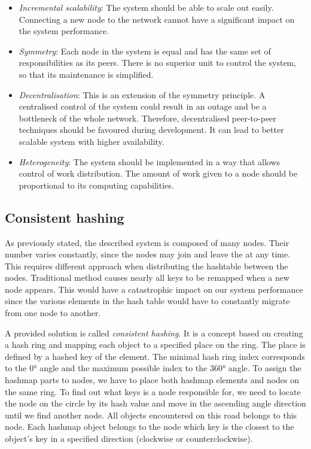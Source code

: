         \begin{itemize}
            \item \textit{Incremental scalability}:
                The system should be able to scale out easily.
                Connecting a new node to the network cannot have a significant impact on the system performance.
            \item \textit{Symmetry}:
                Each node in the system is equal and has the same set of responsibilities as its peers. 
                There is no superior unit to control the system, so that its maintenance is simplified.
            \item \textit{Decentralisation}:
                This is an extension of the symmetry principle.
                A centralised control of the system could result in an outage and be a bottleneck of the whole network.
                Therefore, decentralised peer-to-peer techniques should be favoured during development.
                It can lead to better scalable system with higher availability.
            \item \textit{Heterogeneity}:
                The system should be implemented in a way that allows control of work distribution. 
                The amount of work given to a node should be proportional to its computing capabilities.
        \end{itemize}

    \subsection{Consistent hashing}
        As previously stated, the described system is composed of many nodes. 
        Their number varies constantly, since the nodes may join and leave the at any time.
        This requires different approach when distributing the hashtable between the nodes.
        Traditional method causes nearly all keys to be remapped when a new node appears.
        This would have a catastrophic impact on our system performance since the various elements in the hash table would have to constantly migrate from one node to another.
        
        A provided solution is called \textit{consistent hashing}.
        It is a concept based on creating a hash ring and mapping each object to a specified place on the ring. 
        The place is defined by a hashed key of the element.
        The minimal hash ring index corresponds to the \ang{0} angle and the maximum possible index to the \ang{360} angle.
        To assign the hashmap parts to nodes, we have to place both hashmap elements and nodes on the same ring.
        To find out what keys is a node responsible for, we need to locate the node on the circle by its hash value and move in the ascending angle direction until we find another node. 
        All objects encountered on this road belongs to this node.
        Each hashmap object belongs to the node which key is the closest to the object's key in a specified direction (clockwise or counterclockwise). 
        

